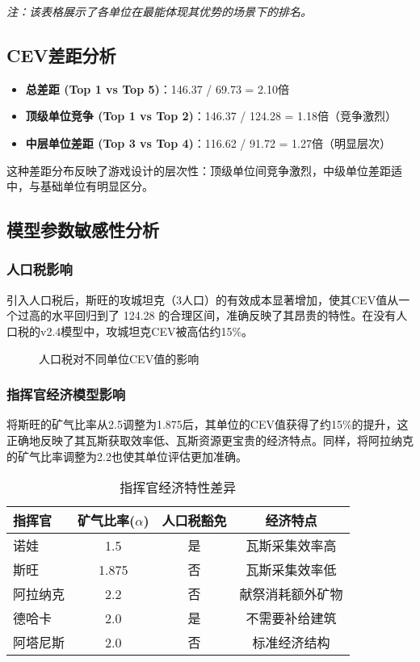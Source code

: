 \documentclass[a4paper,12pt]{article}
\begin{document}
\textit{注：该表格展示了各单位在最能体现其优势的场景下的排名。}

\subsection{CEV差距分析}

\begin{itemize}
    \item \textbf{总差距 (Top 1 vs Top 5)}：146.37 / 69.73 = 2.10倍
    \item \textbf{顶级单位竞争 (Top 1 vs Top 2)}：146.37 / 124.28 = 1.18倍（竞争激烈）
    \item \textbf{中层单位差距 (Top 3 vs Top 4)}：116.62 / 91.72 = 1.27倍（明显层次）
\end{itemize}

这种差距分布反映了游戏设计的层次性：顶级单位间竞争激烈，中级单位差距适中，与基础单位有明显区分。

\subsection{模型参数敏感性分析}

\subsubsection{人口税影响}

引入人口税后，斯旺的攻城坦克（3人口）的有效成本显著增加，使其CEV值从一个过高的水平回归到了 124.28 的合理区间，准确反映了其昂贵的特性。在没有人口税的v2.4模型中，攻城坦克CEV被高估约15\%。

\begin{figure}[htbp]
    \centering
    \caption{人口税对不同单位CEV值的影响}
\end{figure}

\subsubsection{指挥官经济模型影响}

将斯旺的矿气比率从2.5调整为1.875后，其单位的CEV值获得了约15\%的提升，这正确地反映了其瓦斯获取效率低、瓦斯资源更宝贵的经济特点。同样，将阿拉纳克的矿气比率调整为2.2也使其单位评估更加准确。

\begin{table}[htbp]
\centering
\caption{指挥官经济特性差异}
\begin{tabular}{@{}lccc@{}}
\toprule
指挥官 & 矿气比率($\alpha$) & 人口税豁免 & 经济特点 \\
\midrule
诺娃 & 1.5 & 是 & 瓦斯采集效率高 \\
斯旺 & 1.875 & 否 & 瓦斯采集效率低 \\
阿拉纳克 & 2.2 & 否 & 献祭消耗额外矿物 \\
德哈卡 & 2.0 & 是 & 不需要补给建筑 \\
阿塔尼斯 & 2.0 & 否 & 标准经济结构 \\
\bottomrule
\end{tabular}
\end{table}
\end{document}
